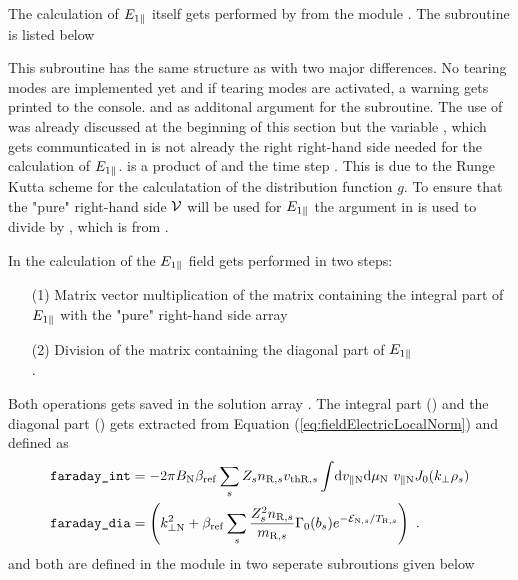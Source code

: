 The calculation of $E_{1\parallel}$ itself gets performed by  from the module . The subroutine is listed below



This subroutine has the same structure as  with two major differences.
No tearing modes are implemented yet and if tearing modes are activated, a warning gets printed to the console.  and  as additonal argument for the subroutine. The use of  was already discussed at the beginning of this section but the variable , which gets communticated in  is not already the right right-hand side needed for the calculation of $E_{1\parallel}$.  is a product of  and the time step . This is due to the Runge Kutta scheme for the calculatation of the distribution function $g$. To ensure that the "pure" right-hand side $\mathcal{V}$ will be used for $E_{1\parallel}$ the argument  in  is used to divide  by , which is  from . \bigskip

In {\gkw} the calculation of the $E_{1\parallel}$ field gets performed in two steps:
\begin{enumerate}
    \item [(1)] Matrix vector multiplication of the matrix containing the integral part of $E_{1\parallel}$ with the "pure" right-hand side array  \\
    \item [(2)] Division of the matrix containing the diagonal part of $E_{1\parallel}$ \\
                .
\end{enumerate}
Both operations gets saved in the solution array . The integral part () and the diagonal part () gets extracted from Equation (\ref{eq:fieldElectricLocalNorm}) and defined as
\begin{gather}
    \begin{aligned}
        \texttt{faraday\_int} &= - 2\pi B_\mathrm{N} \beta_\mathrm{ref} \sum_s Z_s n_{\mathrm{R},s} v_{\mathrm{th}\mathrm{R},s} \int \! \mathrm{d}v_{\parallel \mathrm{N}} \mathrm{d}\mu_\mathrm{N} ~ v_{\parallel \mathrm{N}} J_0(k_\perp \rho_s)\\
        \texttt{faraday\_dia} &= \left(k_{\perp \mathrm{N}}^2 + \beta_\mathrm{ref} \sum_s \frac{Z^2_sn_{\mathrm{R},s}}{m_{\mathrm{R},s}} \Gamma_0(b_s) e^{-\mathcal{E}_{\mathrm{N},s}/T_{\mathrm{R},s}} \right)~.
    \end{aligned}
\end{gather}
 and  both are defined in the module  in two seperate subroutions given below

